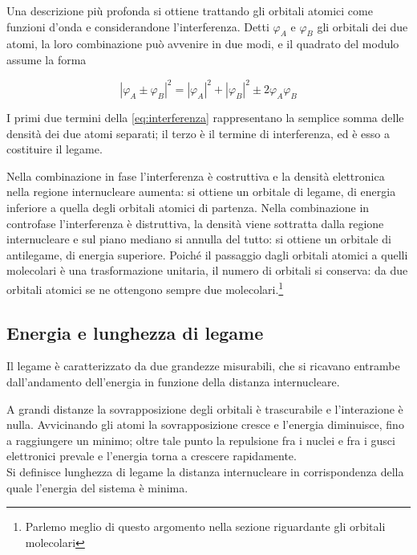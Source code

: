 Una descrizione più profonda si ottiene trattando gli orbitali atomici come funzioni d'onda e considerandone l'interferenza. Detti $\varphi_A$ e $\varphi_B$ gli orbitali dei due atomi, la loro combinazione può avvenire in due modi, e il quadrato del modulo assume la forma

\begin{equation}
    |\varphi_A \pm \varphi_B|^2 = |\varphi_A|^2 + |\varphi_B|^2 \pm 2\varphi_A\varphi_B
    \label{eq:interferenza}
\end{equation}

I primi due termini della \eqref{eq:interferenza} rappresentano la semplice somma delle densità dei due atomi separati; il terzo è il termine di interferenza, ed è esso a costituire il legame.

Nella combinazione in fase l'interferenza è costruttiva e la densità elettronica nella regione internucleare aumenta: si ottiene un orbitale di legame, di energia inferiore a quella degli orbitali atomici di partenza. 
Nella combinazione in controfase l'interferenza è distruttiva, la densità viene sottratta dalla regione internucleare e sul piano mediano si annulla del tutto: si ottiene un orbitale di antilegame, di energia superiore. 
Poiché il passaggio dagli orbitali atomici a quelli molecolari è una trasformazione unitaria, il numero di orbitali si conserva: da due orbitali atomici se ne ottengono sempre due molecolari.\footnote{Parlemo meglio di questo argomento nella sezione riguardante gli orbitali molecolari}

\subsection{Energia e lunghezza di legame}

Il legame è caratterizzato da due grandezze misurabili, che si ricavano entrambe dall'andamento dell'energia in funzione della distanza internucleare.

A grandi distanze la sovrapposizione degli orbitali è trascurabile e l'interazione è nulla. Avvicinando gli atomi la sovrapposizione cresce e l'energia diminuisce, fino a raggiungere un minimo; oltre tale punto la repulsione fra i nuclei e fra i gusci elettronici prevale e l'energia torna a crescere rapidamente.\\

Si definisce lunghezza di legame la distanza internucleare in corrispondenza della quale l'energia del sistema è minima.

